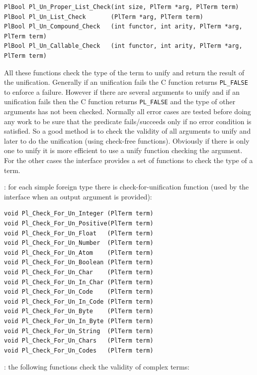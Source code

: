 \begin{Code}
\begin{verbatim}
PlBool Pl_Un_Proper_List_Check(int size, PlTerm *arg, PlTerm term)
PlBool Pl_Un_List_Check       (PlTerm *arg, PlTerm term)
PlBool Pl_Un_Compound_Check   (int functor, int arity, PlTerm *arg, PlTerm term)
PlBool Pl_Un_Callable_Check   (int functor, int arity, PlTerm *arg, PlTerm term)
\end{verbatim}
\end{Code}

All these functions check the type of the term to unify and return the
result of the unification. Generally if an unification fails the C function
returns \texttt{PL\_FALSE} to enforce a failure. However if there are several
arguments to unify and if an unification fails then the C function returns
\texttt{PL\_FALSE} and the type of other arguments has not been checked.
Normally all error cases are tested before doing any work to be sure that
the predicate fails/succeeds only if no error condition is satisfied. So a
good method is to check the validity of all arguments to unify and later
to do the unification (using check-free functions). Obviously if there is
only one to unify it is more efficient to use a unify function checking the
argument. For the other cases the interface provides a set of functions to
check the type of a term.

: for each simple foreign type
 there is check-for-unification function (used
by the interface when an output argument is provided):

\begin{Code}
\begin{verbatim}
void Pl_Check_For_Un_Integer (PlTerm term)
void Pl_Check_For_Un_Positive(PlTerm term)
void Pl_Check_For_Un_Float   (PlTerm term)
void Pl_Check_For_Un_Number  (PlTerm term)
void Pl_Check_For_Un_Atom    (PlTerm term)
void Pl_Check_For_Un_Boolean (PlTerm term)
void Pl_Check_For_Un_Char    (PlTerm term)
void Pl_Check_For_Un_In_Char (PlTerm term)
void Pl_Check_For_Un_Code    (PlTerm term)
void Pl_Check_For_Un_In_Code (PlTerm term)
void Pl_Check_For_Un_Byte    (PlTerm term)
void Pl_Check_For_Un_In_Byte (PlTerm term)
void Pl_Check_For_Un_String  (PlTerm term)
void Pl_Check_For_Un_Chars   (PlTerm term)
void Pl_Check_For_Un_Codes   (PlTerm term)
\end{verbatim}
\end{Code}

: the following functions check the validity of
complex terms:

